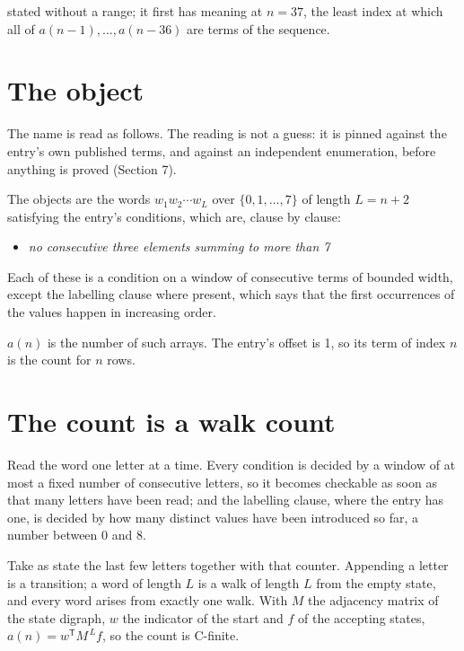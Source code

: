 \documentclass[11pt]{article}
\theoremstyle{definition}
\begin{document}
stated without a range; it first has meaning at $n = 37$, the least index at which all of $a(n-1),\dots,a(n-36)$ are terms of the sequence.

\section{The object}

The name is read as follows. The reading is not a guess: it is pinned against the entry's own published terms, and against an independent enumeration, before anything is proved (Section 7).

The objects are the words $w_1 w_2 \cdots w_L$ over $\{0,1,\dots,7\}$ of length $L = n + 2$ satisfying the entry's conditions, which are, clause by clause:

\begin{itemize}

\item {\itshape no consecutive three elements summing to more than 7}

\end{itemize}

Each of these is a condition on a window of consecutive terms of bounded width, except the labelling clause where present, which says that the first occurrences of the values happen in increasing order.

$a(n)$ is the number of such arrays. The entry's offset is 1, so its term of index $n$ is the count for $n$ rows.

\section{The count is a walk count}

Read the word one letter at a time. Every condition is decided by a window of at most a fixed number of consecutive letters, so it becomes checkable as soon as that many letters have been read; and the labelling clause, where the entry has one, is decided by how many distinct values have been introduced so far, a number between $0$ and 8.

Take as state the last few letters together with that counter. Appending a letter is a transition; a word of length $L$ is a walk of length $L$ from the empty state, and every word arises from exactly one walk. With $M$ the adjacency matrix of the state digraph, $w$ the indicator of the start and $f$ of the accepting states, $a(n) = w^{\mathsf T}M^{\,L}f$, so the count is C-finite.
\end{document}
